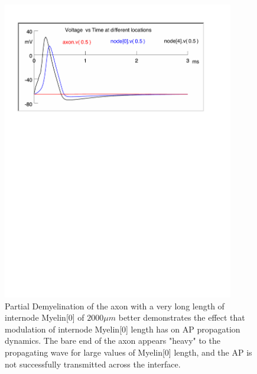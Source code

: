 \documentclass[12pt]{article}
\begin{document}
\begin{figure}[H]
\centering
\includegraphics[width=0.9\textwidth]{Results/4c-2000}
\caption{\label{fig:P4c3} Partial Demyelination of the axon with a very long length of internode Myelin[0] of $2000 \mu m$ better demonstrates the effect that modulation of internode Myelin[0] length has on AP propagation dynamics. The bare end of the axon appears "heavy" to the propagating wave for large values of Myelin[0] length, and the AP is not successfully transmitted across the interface.}
\end{figure}
\end{document}
